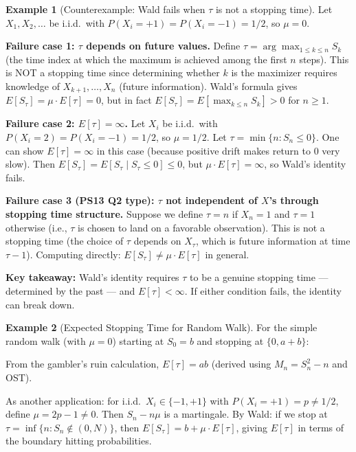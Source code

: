 \documentclass[12pt, a4paper]{article}
\theoremstyle{definition}
\newtheorem{example}{Example}[section]
\theoremstyle{plain}
\begin{document}
\begin{example}[Counterexample: Wald fails when $\tau$ is not a stopping time]
\label{ex:wald-fail}
Let $X_1, X_2, \ldots$ be i.i.d.\ with $P(X_i = +1) = P(X_i = -1) = 1/2$, so $\mu = 0$.

\textbf{Failure case 1: $\tau$ depends on future values.} Define $\tau = \arg\max_{1 \le k \le n} S_k$ (the time index at which the maximum is achieved among the first $n$ steps). This is NOT a stopping time since determining whether $k$ is the maximizer requires knowledge of $X_{k+1}, \ldots, X_n$ (future information). Wald's formula gives $E[S_\tau] = \mu \cdot E[\tau] = 0$, but in fact $E[S_\tau] = E[\max_{k \le n} S_k] > 0$ for $n \ge 1$.

\textbf{Failure case 2: $E[\tau] = \infty$.} Let $X_i$ be i.i.d.\ with $P(X_i = 2) = P(X_i = -1) = 1/2$, so $\mu = 1/2$. Let $\tau = \min\{n : S_n \le 0\}$. One can show $E[\tau] = \infty$ in this case (because positive drift makes return to 0 very slow). Then $E[S_\tau] = E[S_\tau \mid S_\tau \le 0] \le 0$, but $\mu \cdot E[\tau] = \infty$, so Wald's identity fails.

\textbf{Failure case 3 (PS13 Q2 type): $\tau$ not independent of $X$'s through stopping time structure.} Suppose we define $\tau = n$ if $X_n = 1$ and $\tau = 1$ otherwise (i.e., $\tau$ is chosen to land on a favorable observation). This is not a stopping time (the choice of $\tau$ depends on $X_\tau$, which is future information at time $\tau - 1$). Computing directly: $E[S_\tau] \ne \mu \cdot E[\tau]$ in general.

\textbf{Key takeaway:} Wald's identity requires $\tau$ to be a genuine stopping time — determined by the past — and $E[\tau] < \infty$. If either condition fails, the identity can break down.
\end{example}

\begin{example}[Expected Stopping Time for Random Walk]
For the simple random walk (with $\mu = 0$) starting at $S_0 = b$ and stopping at $\{0, a+b\}$:

From the gambler's ruin calculation, $E[\tau] = ab$ (derived using $M_n = S_n^2 - n$ and OST).

As another application: for i.i.d.\ $X_i \in \{-1, +1\}$ with $P(X_i = +1) = p \neq 1/2$, define $\mu = 2p-1 \neq 0$. Then $S_n - n\mu$ is a martingale. By Wald: if we stop at $\tau = \inf\{n : S_n \notin (0, N)\}$, then $E[S_\tau] = b + \mu \cdot E[\tau]$, giving $E[\tau]$ in terms of the boundary hitting probabilities.
\end{example}
\end{document}
